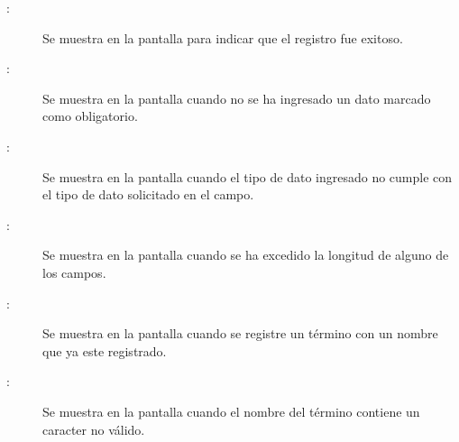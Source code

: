 	
\begin{description}
	\item[:] Se muestra en la pantalla  para indicar que el registro fue exitoso.
	\item[:] Se muestra en la pantalla  cuando no se ha ingresado un dato marcado como obligatorio.
	\item[:] Se muestra en la pantalla  cuando el tipo de dato ingresado no cumple con el tipo de dato solicitado en el campo.
	\item[:] Se muestra en la pantalla  cuando se ha excedido la longitud de alguno de los campos.
	\item[:] Se muestra en la pantalla  cuando se registre un término con un nombre que ya este registrado.
	\item[:] Se muestra en la pantalla  cuando el nombre del término contiene un caracter no válido.
\end{description}
